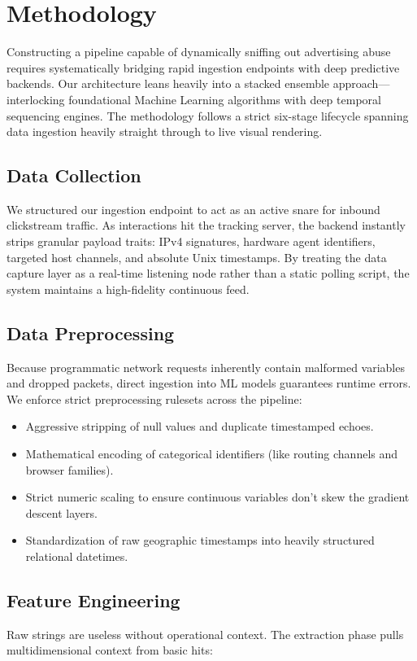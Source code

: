 \documentclass[conference]{IEEEtran}
\begin{document}
\section{Methodology}
Constructing a pipeline capable of dynamically sniffing out advertising abuse requires systematically bridging rapid ingestion endpoints with deep predictive backends. Our architecture leans heavily into a stacked ensemble approach—interlocking foundational Machine Learning algorithms with deep temporal sequencing engines. The methodology follows a strict six-stage lifecycle spanning data ingestion heavily straight through to live visual rendering.

\subsection{Data Collection}
We structured our ingestion endpoint to act as an active snare for inbound clickstream traffic. As interactions hit the tracking server, the backend instantly strips granular payload traits: IPv4 signatures, hardware agent identifiers, targeted host channels, and absolute Unix timestamps. By treating the data capture layer as a real-time listening node rather than a static polling script, the system maintains a high-fidelity continuous feed.

\subsection{Data Preprocessing}
Because programmatic network requests inherently contain malformed variables and dropped packets, direct ingestion into ML models guarantees runtime errors. We enforce strict preprocessing rulesets across the pipeline:
\begin{itemize}
    \item Aggressive stripping of null values and duplicate timestamped echoes.
    \item Mathematical encoding of categorical identifiers (like routing channels and browser families).
    \item Strict numeric scaling to ensure continuous variables don't skew the gradient descent layers.
    \item Standardization of raw geographic timestamps into heavily structured relational datetimes.
\end{itemize}

\subsection{Feature Engineering}
Raw strings are useless without operational context. The extraction phase pulls multidimensional context from basic hits:
\end{document}
